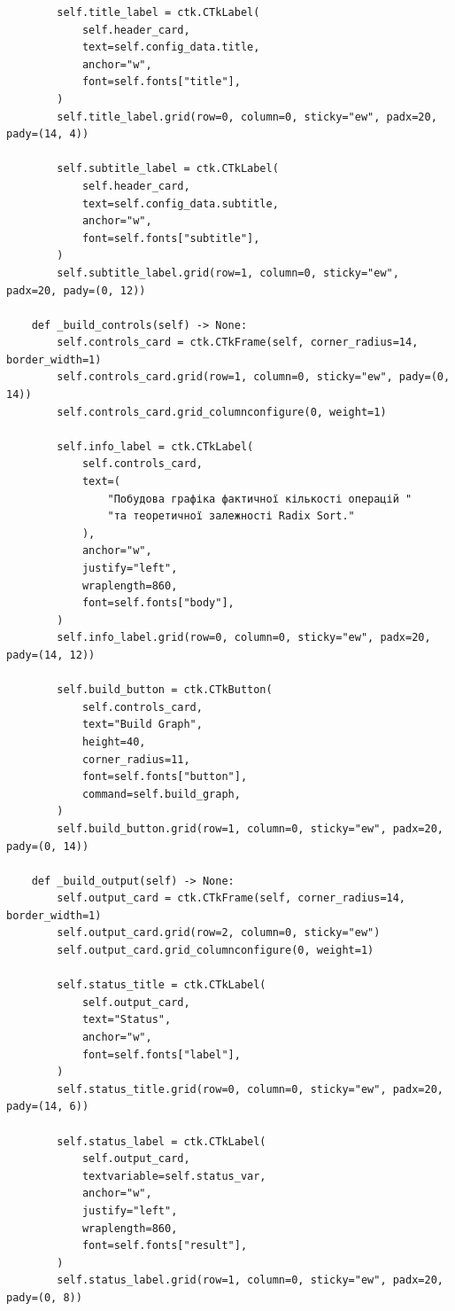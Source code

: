 \documentclass[12pt,a4paper]{article}
\begin{document}
\begin{verbatim}
        self.title_label = ctk.CTkLabel(
            self.header_card,
            text=self.config_data.title,
            anchor="w",
            font=self.fonts["title"],
        )
        self.title_label.grid(row=0, column=0, sticky="ew", padx=20, pady=(14, 4))

        self.subtitle_label = ctk.CTkLabel(
            self.header_card,
            text=self.config_data.subtitle,
            anchor="w",
            font=self.fonts["subtitle"],
        )
        self.subtitle_label.grid(row=1, column=0, sticky="ew", padx=20, pady=(0, 12))

    def _build_controls(self) -> None:
        self.controls_card = ctk.CTkFrame(self, corner_radius=14, border_width=1)
        self.controls_card.grid(row=1, column=0, sticky="ew", pady=(0, 14))
        self.controls_card.grid_columnconfigure(0, weight=1)

        self.info_label = ctk.CTkLabel(
            self.controls_card,
            text=(
                "Побудова графіка фактичної кількості операцій "
                "та теоретичної залежності Radix Sort."
            ),
            anchor="w",
            justify="left",
            wraplength=860,
            font=self.fonts["body"],
        )
        self.info_label.grid(row=0, column=0, sticky="ew", padx=20, pady=(14, 12))

        self.build_button = ctk.CTkButton(
            self.controls_card,
            text="Build Graph",
            height=40,
            corner_radius=11,
            font=self.fonts["button"],
            command=self.build_graph,
        )
        self.build_button.grid(row=1, column=0, sticky="ew", padx=20, pady=(0, 14))

    def _build_output(self) -> None:
        self.output_card = ctk.CTkFrame(self, corner_radius=14, border_width=1)
        self.output_card.grid(row=2, column=0, sticky="ew")
        self.output_card.grid_columnconfigure(0, weight=1)

        self.status_title = ctk.CTkLabel(
            self.output_card,
            text="Status",
            anchor="w",
            font=self.fonts["label"],
        )
        self.status_title.grid(row=0, column=0, sticky="ew", padx=20, pady=(14, 6))

        self.status_label = ctk.CTkLabel(
            self.output_card,
            textvariable=self.status_var,
            anchor="w",
            justify="left",
            wraplength=860,
            font=self.fonts["result"],
        )
        self.status_label.grid(row=1, column=0, sticky="ew", padx=20, pady=(0, 8))


\end{verbatim}
\end{document}
